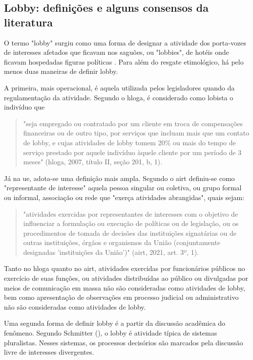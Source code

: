 \subsection{Lobby: definições e alguns consensos da literatura}
\label{subsection:lobbydef}
O termo "lobby" surgiu como uma forma de designar a atividade dos porta-vozes de interesses afetados que ficavam nos saguões, ou "lobbies", de hotéis onde ficavam hospedadas figuras políticas \cite{mancuso2018}. Para além do resgate etimológico, há pelo menos duas maneiras de definir lobby.

A primeira, mais operacional, é aquela utilizada pelos legisladores quando da regulamentação da atividade. Segundo o \acrfull{hloga}, é considerado como lobista o indivíduo que 

\begin{quote}
"seja empregado ou contratado por um cliente em troca de compensações financeiras ou de outro tipo, por serviços que incluam mais que um contato de lobby, e cujas atividades de lobby tomem 20\% ou mais do tempo de serviço prestado por aquele indivíduo àquele cliente por um período de 3 meses" (\acrshort{hloga}, 2007, título II, seção 201, b, 1).
\end{quote}

Já na \acrshort{ue}, adota-se uma definição mais ampla. Segundo o \acrfull{airt} definiu-se como "representante de interesse" aquela pessoa singular ou coletiva, ou grupo formal ou informal, associação ou rede que "exerça atividades abrangidas", quais sejam: 
\begin{quote}
"atividades exercidas por representantes de interesses com o objetivo de influenciar a formulação ou execução de políticas ou de legislação, ou os procedimentos de tomada de decisões das instituições signatárias ou de outras instituições, órgãos e organismos da União (conjuntamente designadas 'instituições da União')" (\acrshort{airt}, 2021, art. 3º, 1).
\end{quote}

Tanto no \acrshort{hloga} quanto no \acrshort{airt}, atividades exercidas por funcionários públicos no exercício de suas funções, ou atividades distribuídas ao público ou divulgadas por meios de comunicação em massa não são consideradas como atividades de lobby, bem como apresentação de observações em processo judicial ou administrativo não são consideradas como atividades de lobby. 

Uma segunda forma de definir lobby é a partir da discussão acadêmica do fenômeno. Segundo Schmitter (\citeyear{schmitter1974still}), o lobby é atividade típica de sistemas pluralistas. Nesses sistemas, os processos decisórios são marcados pela discussão livre de interesses divergentes. 

